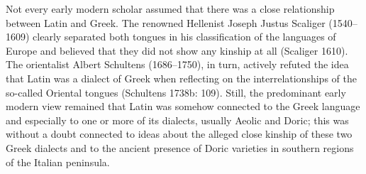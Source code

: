 \begin{styleStandard}
Not every early modern scholar assumed that there was a close relationship between Latin and Greek. The renowned Hellenist Joseph Justus Scaliger (1540–1609) clearly separated both tongues in his classification of the languages of Europe and believed that they did not show any kinship at all (Scaliger 1610). The orientalist Albert Schultens (1686–1750), in turn, actively refuted the idea that Latin was a dialect of Greek when reflecting on the interrelationships of the so-called Oriental tongues (Schultens 1738b: 109). Still, the predominant early modern view remained that Latin was somehow connected to the Greek language and especially to one or more of its dialects, usually Aeolic and Doric; this was without a doubt connected to ideas about the alleged close kinship of these two Greek dialects and to the ancient presence of Doric varieties in southern regions of the Italian peninsula.
\end{styleStandard}

